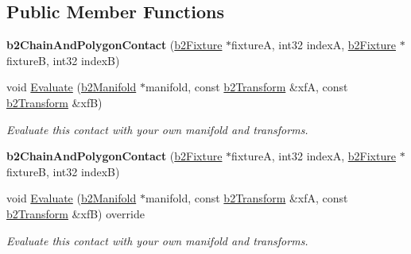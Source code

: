 \subsection*{Public Member Functions}
\begin{DoxyCompactItemize}
\item 
\mbox{\label{classb2ChainAndPolygonContact_ae43cd05c72ccaeb5f03efc5df944648b}} 
{\bfseries b2\+Chain\+And\+Polygon\+Contact} (\hyperlink{classb2Fixture}{b2\+Fixture} $\ast$fixtureA, int32 indexA, \hyperlink{classb2Fixture}{b2\+Fixture} $\ast$fixtureB, int32 indexB)
\item 
\mbox{\label{classb2ChainAndPolygonContact_a8c25ceb49d981797d0a7f8a1ea769442}} 
void \hyperlink{classb2ChainAndPolygonContact_a8c25ceb49d981797d0a7f8a1ea769442}{Evaluate} (\hyperlink{structb2Manifold}{b2\+Manifold} $\ast$manifold, const \hyperlink{structb2Transform}{b2\+Transform} \&xfA, const \hyperlink{structb2Transform}{b2\+Transform} \&xfB)
\begin{DoxyCompactList}\small\item\em Evaluate this contact with your own manifold and transforms. \end{DoxyCompactList}\item 
\mbox{\label{classb2ChainAndPolygonContact_ae43cd05c72ccaeb5f03efc5df944648b}} 
{\bfseries b2\+Chain\+And\+Polygon\+Contact} (\hyperlink{classb2Fixture}{b2\+Fixture} $\ast$fixtureA, int32 indexA, \hyperlink{classb2Fixture}{b2\+Fixture} $\ast$fixtureB, int32 indexB)
\item 
\mbox{\label{classb2ChainAndPolygonContact_a607e7a8b4b0a5ee9bfd100a365fb6f3b}} 
void \hyperlink{classb2ChainAndPolygonContact_a607e7a8b4b0a5ee9bfd100a365fb6f3b}{Evaluate} (\hyperlink{structb2Manifold}{b2\+Manifold} $\ast$manifold, const \hyperlink{structb2Transform}{b2\+Transform} \&xfA, const \hyperlink{structb2Transform}{b2\+Transform} \&xfB) override
\begin{DoxyCompactList}\small\item\em Evaluate this contact with your own manifold and transforms. \end{DoxyCompactList}\end{DoxyCompactItemize}
